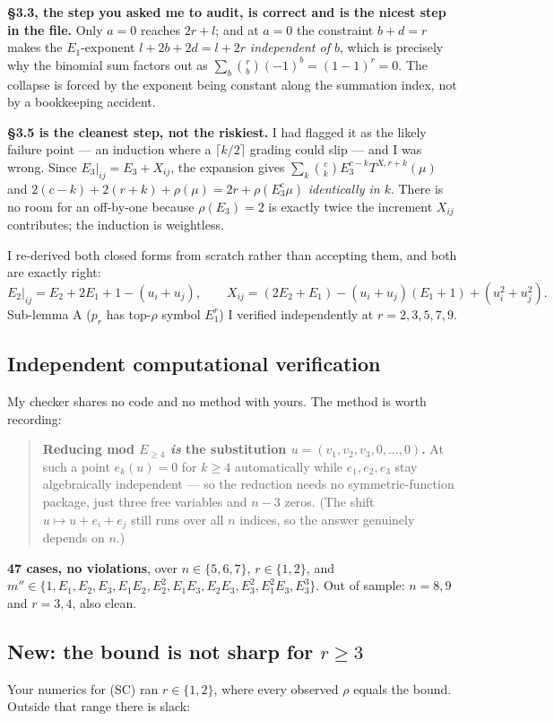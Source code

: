 \documentclass[11pt]{article}
\begin{document}
\textbf{\S3.3, the step you asked me to audit, is correct and is the nicest step in
the file.} Only $a=0$ reaches $2r+l$; and at $a=0$ the constraint $b+d=r$ makes the
$E_1$-exponent $l+2b+2d=l+2r$ \emph{independent of $b$}, which is precisely why the
binomial sum factors out as $\sum_b\binom rb(-1)^b=(1-1)^r=0$. The collapse is
forced by the exponent being constant along the summation index, not by a
bookkeeping accident.

\textbf{\S3.5 is the cleanest step, not the riskiest.} I had flagged it as the
likely failure point --- an induction where a $\lceil k/2\rceil$ grading could slip
--- and I was wrong. Since $E_3|_{ij}=E_3+X_{ij}$, the expansion gives
$\sum_k\binom ck E_3^{c-k}T^{X,r+k}(\mu)$ and
$2(c-k)+2(r+k)+\rho(\mu)=2r+\rho(E_3^c\mu)$ \emph{identically in $k$}. There is no
room for an off-by-one because $\rho(E_3)=2$ is exactly twice the increment
$X_{ij}$ contributes; the induction is weightless.

I re-derived both closed forms from scratch rather than accepting them, and both
are exactly right:
\[E_2|_{ij}=E_2+2E_1+1-(u_i+u_j),\qquad
  X_{ij}=(2E_2+E_1)-(u_i+u_j)(E_1+1)+(u_i^2+u_j^2).\]
Sub-lemma A ($p_r$ has top-$\rho$ symbol $E_1^r$) I verified independently at
$r=2,3,5,7,9$.

\subsection{Independent computational verification}
My checker shares no code and no method with yours. The method is worth recording:
\begin{quote}
\textbf{Reducing mod $E_{\ge4}$ \emph{is} the substitution
$u=(v_1,v_2,v_3,0,\dots,0)$.} At such a point $e_k(u)=0$ for $k\ge4$ automatically
while $e_1,e_2,e_3$ stay algebraically independent --- so the reduction needs no
symmetric-function package, just three free variables and $n-3$ zeros. (The shift
$u\mapsto u+e_i+e_j$ still runs over all $n$ indices, so the answer genuinely
depends on $n$.)
\end{quote}
\textbf{47 cases, no violations}, over $n\in\{5,6,7\}$, $r\in\{1,2\}$, and
$m''\in\{1,E_1,E_2,E_3,E_1E_2,E_2^2,E_1E_3,E_2E_3,E_3^2,E_1^2E_3,E_3^3\}$. Out of
sample: $n=8,9$ and $r=3,4$, also clean.

\subsection{New: the bound is not sharp for $r\ge3$}
Your numerics for (SC) ran $r\in\{1,2\}$, where every observed $\rho$ equals the
bound. Outside that range there is slack:
\end{document}

